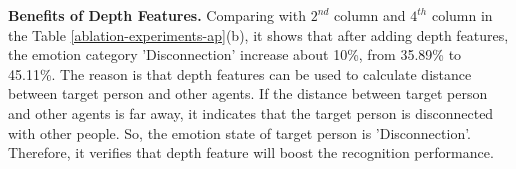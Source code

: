 \documentclass[conference]{IEEEtran}
\begin{document}
\begin{table}[htbp]
%
  \label{ablation-experiments-ap}   
\end{table}

 \textbf{Benefits of Depth Features.} Comparing with $2^{nd}$ column and $4^{th}$ column in the Table \ref{ablation-experiments-ap}(b), it shows that after adding depth features, the emotion category 'Disconnection' increase about 10\%, from 35.89\% to 45.11\%. The reason is that depth features can be used to calculate distance between target person and other agents. If the distance between target person and other agents is far away, it indicates that the target person is disconnected with other people. So, the emotion state of target person is 'Disconnection'. Therefore, it verifies that depth feature will boost the recognition performance.
\end{document}
